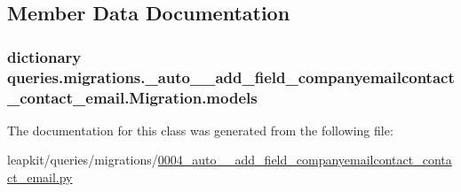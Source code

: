 \subsection{Member Data Documentation}
\hypertarget{classqueries_1_1migrations_1_10004__auto____add__field__companyemailcontact__contact__email_1_1_migration_a799bc75f91e4247a813a0826e4cef5c7}{
\subsubsection[{models}]{\setlength{\rightskip}{0pt plus 5cm}dictionary queries.\-migrations.\-\_\-auto\-\_\-\-\_\-add\-\_\-field\-\_\-companyemailcontact\-\_\-contact\-\_\-email.\-Migration.\-models\hspace{0.3cm}{\ttfamily [static]}}}\label{classqueries_1_1migrations_1_10004__auto____add__field__companyemailcontact__contact__email_1_1_migration_a799bc75f91e4247a813a0826e4cef5c7}


The documentation for this class was generated from the following file\-:\begin{DoxyCompactItemize}
\item 
leapkit/queries/migrations/\hyperlink{0004__auto____add__field__companyemailcontact__contact__email_8py}{0004\-\_\-auto\-\_\-\-\_\-add\-\_\-field\-\_\-companyemailcontact\-\_\-contact\-\_\-email.\-py}\end{DoxyCompactItemize}
